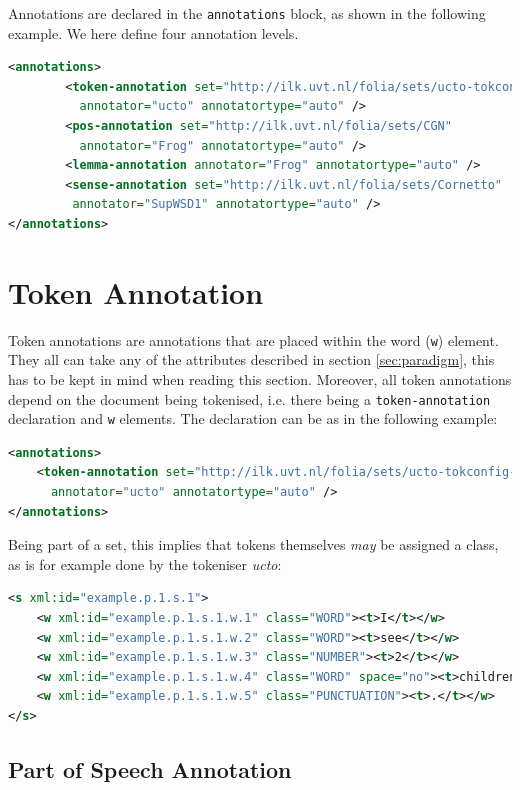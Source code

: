 \documentclass[a4paper,12pt]{report}
\begin{document}
Annotations are declared in the \texttt{annotations} block, as shown in the following example. We here define four annotation levels.

\begin{lstlisting}[language=xml]
<annotations>
        <token-annotation set="http://ilk.uvt.nl/folia/sets/ucto-tokconfig-nl" 
          annotator="ucto" annotatortype="auto" />
        <pos-annotation set="http://ilk.uvt.nl/folia/sets/CGN" 
          annotator="Frog" annotatortype="auto" />
        <lemma-annotation annotator="Frog" annotatortype="auto" />    
        <sense-annotation set="http://ilk.uvt.nl/folia/sets/Cornetto"
         annotator="SupWSD1" annotatortype="auto" />    
</annotations>
\end{lstlisting}


\section{Token Annotation}

Token annotations are annotations that are placed within the word (\texttt{w}) element. They all can take any of the attributes described in section \ref{sec:paradigm}, this has to be kept in mind when reading this section. Moreover, all token annotations depend on the document being tokenised, i.e. there being a \texttt{token-annotation} declaration and \texttt{w} elements. The declaration can be as in the following example:

\begin{lstlisting}[language=xml]
<annotations>
    <token-annotation set="http://ilk.uvt.nl/folia/sets/ucto-tokconfig-nl"
      annotator="ucto" annotatortype="auto" />
</annotations>
\end{lstlisting}

Being part of a set, this implies that tokens themselves \emph{may} be assigned a class, as is for example done by the tokeniser \emph{ucto}:

\begin{lstlisting}[language=xml]
<s xml:id="example.p.1.s.1">
    <w xml:id="example.p.1.s.1.w.1" class="WORD"><t>I</t></w>
    <w xml:id="example.p.1.s.1.w.2" class="WORD"><t>see</t></w>
    <w xml:id="example.p.1.s.1.w.3" class="NUMBER"><t>2</t></w>
    <w xml:id="example.p.1.s.1.w.4" class="WORD" space="no"><t>children</t></w>
    <w xml:id="example.p.1.s.1.w.5" class="PUNCTUATION"><t>.</t></w>
</s>
\end{lstlisting}        


\subsection{Part of Speech Annotation}
\end{document}
